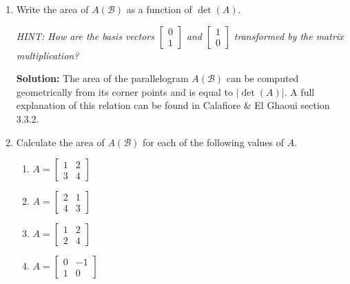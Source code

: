 \documentclass[10pt]{article}
\theoremstyle{definition}
\theoremstyle{plain}
\begin{document}
\begin{enumerate}[label=(\alph*)]
\item Write the area of $A(\mathcal{B})$ as a function of $\det(A)$.

\textit{HINT: How are the basis vectors $\begin{bmatrix} 0 \\ 1 \end{bmatrix}$ and $\begin{bmatrix} 1 \\ 0 \end{bmatrix}$ transformed by the matrix multiplication?}

\textbf{Solution:} The area of the parallelogram $A(\mathcal{B})$ can be computed geometrically from its corner points and is equal to $|\det(A)|$. A full explanation of this relation can be found in Calafiore \& El Ghaoui section 3.3.2.

\item Calculate the area of $A(\mathcal{B})$ for each of the following values of $A$.
\begin{enumerate}[label=\roman*.]
\item $A = \begin{bmatrix} 1 & 2 \\ 3 & 4 \end{bmatrix}$
\item $A = \begin{bmatrix} 2 & 1 \\ 4 & 3 \end{bmatrix}$
\item $A = \begin{bmatrix} 1 & 2 \\ 2 & 4 \end{bmatrix}$
\item $A = \begin{bmatrix} 0 & -1 \\ 1 & 0 \end{bmatrix}$
\end{enumerate}


\end{enumerate}
\end{document}
